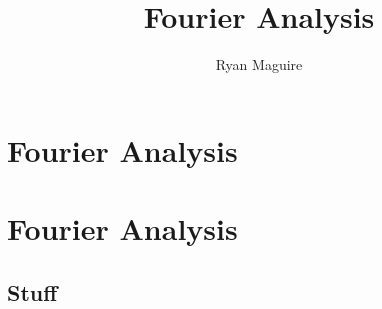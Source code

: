 \documentclass[crop=false,class=book,oneside]{standalone}
\begin{document}
    \ifx\ifmain\undefined
        \title{Fourier Analysis}
        \author{Ryan Maguire}
        \date{\vspace{-5ex}}
        \maketitle
        \tableofcontents
        \clearpage
        \chapter*{Fourier Analysis}
        \vspace{10ex}
        \setcounter{chapter}{1}
    \else
        \chapter{Fourier Analysis}
    \fi
    \section{Stuff}
\end{document}
